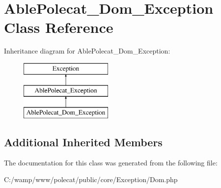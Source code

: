 \hypertarget{class_able_polecat___dom___exception}{}\section{Able\+Polecat\+\_\+\+Dom\+\_\+\+Exception Class Reference}
\label{class_able_polecat___dom___exception}
Inheritance diagram for Able\+Polecat\+\_\+\+Dom\+\_\+\+Exception\+:\begin{figure}[H]
\begin{center}
\leavevmode
\includegraphics[height=3.000000cm]{class_able_polecat___dom___exception}
\end{center}
\end{figure}
\subsection*{Additional Inherited Members}


The documentation for this class was generated from the following file\+:\begin{DoxyCompactItemize}
\item 
C\+:/wamp/www/polecat/public/core/\+Exception/Dom.\+php\end{DoxyCompactItemize}
